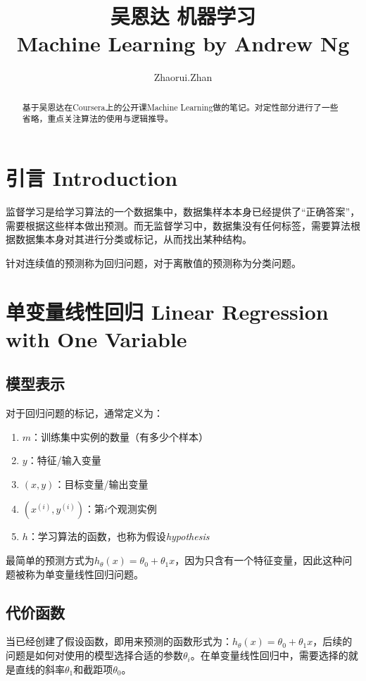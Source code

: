 \documentclass[12pt, a4paper]{article}
\title{吴恩达 机器学习 \\ Machine Learning by Andrew Ng}
\author{Zhaorui.Zhan}
\date{}
\begin{document}
    \maketitle

    \begin{abstract}    
        基于吴恩达在Coursera上的公开课Machine Learning做的笔记。对定性部分进行了一些省略，重点关注算法的使用与逻辑推导。
    \end{abstract}

    \tableofcontents
    \newpage

    \section{引言 Introduction}

        监督学习是给学习算法的一个数据集中，数据集样本本身已经提供了“正确答案”，需要根据这些样本做出预测。而无监督学习中，数据集没有任何标签，需要算法根据数据集本身对其进行分类或标记，从而找出某种结构。

        针对连续值的预测称为回归问题，对于离散值的预测称为分类问题。

    \section{单变量线性回归 Linear Regression with One Variable}

        \subsection{模型表示}
            对于回归问题的标记，通常定义为：

            \begin{enumerate}
                \item $m$：训练集中实例的数量（有多少个样本）
                \item $y$：特征/输入变量
                \item $(x, y)$：目标变量/输出变量
                \item $(x^{(i)}, y^{(i)})$：第$i$个观测实例
                \item $h$：学习算法的函数，也称为假设\textit{hypothesis}
            \end{enumerate}

            最简单的预测方式为$h_\theta(x)=\theta_0 + \theta_1x$，因为只含有一个特征变量，因此这种问题被称为单变量线性回归问题。

        \subsection{代价函数}
            当已经创建了假设函数，即用来预测的函数形式为：$h_\theta(x)=\theta_0 + \theta_1x$，后续的问题是如何对使用的模型选择合适的参数$\theta_i$。在单变量线性回归中，需要选择的就是直线的斜率$\theta_1$和截距项$\theta_0$。
\end{document}
